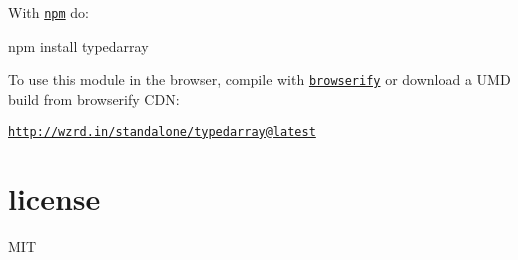 With \href{https://npmjs.org}{\tt npm} do\+:


\begin{DoxyCode}
npm install typedarray
\end{DoxyCode}


To use this module in the browser, compile with \href{http://browserify.org}{\tt browserify} or download a U\+MD build from browserify C\+DN\+:

\href{http://wzrd.in/standalone/typedarray@latest}{\tt http\+://wzrd.\+in/standalone/typedarray@latest}

\section*{license}

M\+IT 
